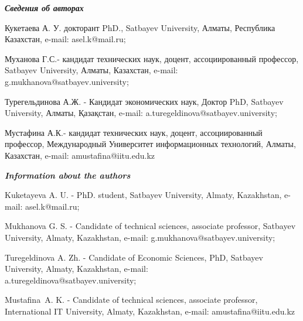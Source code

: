 \begin{authorinfo}
\emph{{\bfseries Сведения об авторах}}

Кукетаева А. У. докторант PhD., Satbayev University, Алматы, Республика
Казахстан, e-mail: asel.k@mail.ru;

Муханова Г.С.- кандидат технических наук, доцент, ассоциированный
профессор, Satbayev University, Алматы, Казахстан, e-mail:
g.mukhanova@satbayev.university;

Турегельдинова А.Ж. - Кандидат экономических наук, Доктор PhD,
Satbayev University, Алматы, Қазақстан, e-mail:
a.turegeldinova@satbayev.university;

Мустафина А.К.- кандидат технических наук, доцент, ассоциированный
профессор, Международный Университет информационных технологий, Алматы,
Казахстан, e-mail: amustafina@iitu.edu.kz

\emph{{\bfseries Information about the authors}}

Kuketayeva A. U. - PhD. student, Satbayev University, Almaty,
Kazakhstan, e-mail: asel.k@mail.ru;

Mukhanova G. S. - Candidate of technical sciences, associate professor,
Satbayev University, Almaty, Kazakhstan, e-mail:
g.mukhanova@satbayev.university;

Turegeldinova A. Zh. - Candidate of Economic Sciences, PhD,
Satbayev University, Almaty, Kazakhstan, e-mail:\\
a.turegeldinova@satbayev.university;

Mustafina~A. K. - Candidate of technical sciences, associate
professor, International IT University, Almaty, Kazakhstan, e-mail:
amustafina@iitu.edu.kz
\end{authorinfo}
